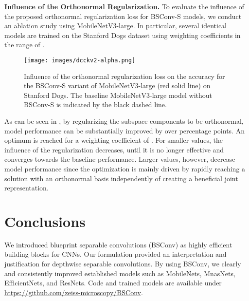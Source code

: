 \documentclass[10pt,twocolumn,letterpaper]{article}
\newcommand{\DCCK}{BSConv\xspace}
\newcommand{\DCCKS}{\DCCK-S\xspace}
\begin{document}
\textbf{Influence of the Orthonormal Regularization.}
To evaluate the influence of the proposed orthonormal regularization loss for \DCCKS models, we conduct an ablation study using MobileNetV3-large.
In particular, several identical models are trained on the Stanford Dogs dataset using weighting coefficients  in the range of .

\begin{figure}
	\center
	\texttt{[image: images/dcckv2-alpha.png]}
	\caption{Influence of the orthonormal regularization loss on the accuracy for the \DCCKS variant of MobileNetV3-large (red solid line) on Stanford Dogs.
		The baseline MobileNetV3-large model without \DCCKS is indicated by the black dashed line.
	}
     \label{fig:dcckV2Alpha}
\end{figure}

As can be seen in , by regularizing the subspace components to be orthonormal, model performance can be substantially improved by over  percentage points.
An optimum is reached for a weighting coefficient of .
For smaller values, the influence of the regularization decreases, until it is no longer effective and converges towards the baseline performance.
Larger values, however, decrease model performance since the optimization is mainly driven by rapidly reaching a solution with an orthonormal basis independently of creating a beneficial joint representation.



\section{Conclusions}
We introduced blueprint separable convolutions (\DCCK) as highly efficient building blocks for CNNs.
Our formulation provided an interpretation and justification for depthwise separable convolutions.
By using \DCCK, we clearly and consistently improved established models such as MobileNets, MnasNets, EfficientNets, and ResNets.
Code and trained models are available under \url{https://github.com/zeiss-microscopy/BSConv}. 



{\small


}
\end{document}
